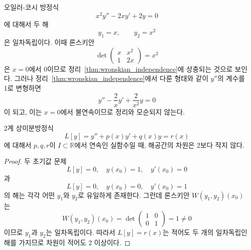 \documentclass[../engineering_mathematics_lecture_note.tex]{subfiles}
\begin{document}
\begin{remark}
    오일러-코시 방정식
    \begin{equation*}
        x^2 y'' - 2xy' + 2y = 0
    \end{equation*}
    에 대해서 두 해
    \begin{equation*}
        y_1 = x, \qquad y_2 =x^2
    \end{equation*}
    은 일차독립이다.
    이때 론스키안
    \begin{equation*}
        \det
        \begin{pmatrix}
            x & x^2\\
            1 & 2x
        \end{pmatrix}
        = x^2
    \end{equation*}
    은 $x = 0$에서 0이므로 정리~\ref{thm:wronskian_independence}에 상충되는 것으로 보인다.
    그러나 정리~\ref{thm:wronskian_independence}에서 다룬 형태와 같이 $y''$의 계수를 1로 변형하면
    \begin{equation*}
        y'' - \frac2x y' + \frac{2}{x^2} y = 0
    \end{equation*}
    이 되고, 이는 $x = 0$에서 불연속이므로 정리와 모순되지 않는다.
\end{remark}

\begin{theorem} \label{thm:2nd_order_sol_space_at_least_dim_2}
    2계 상미분방정식
    \begin{equation*}
        L[y] = y'' + p(x) y' + q(x) y = r(x)
    \end{equation*}
    에 대해서
    $p, q, r$이 $I \subset \mathbb R$에서 연속인 실함수일 때, 해공간의 차원은 2보다 작지 않다.
\end{theorem}

\begin{proof}
    두 초기값 문제
    \begin{equation*}
        L[y] = 0, \quad y(x_0) = 1, \quad y'(x_0) = 0
    \end{equation*}
    과
    \begin{equation*}
        L[y] = 0, \quad y(x_0) = 0, \quad y'(x_0) = 1
    \end{equation*}
    의 해는 각각 어떤 $y_1$와 $y_2$로 유일하게 존재한다.
    그런데 론스키안 $W(y_1, y_2)(x_0)$는
    \begin{equation*}
        W(y_1, y_2)(x_0) = \det \begin{pmatrix}
            1 & 0\\
            0 & 1
        \end{pmatrix}
        = 1 \neq 0
    \end{equation*}
    이므로 $y_1$과 $y_2$는 일차독립이다.
    따라서 $L[y] = r(x)$는 적어도 두 개의 일차독립인 해를 가지므로 차원이 적어도 2 이상이다.
\end{proof}
\end{document}
